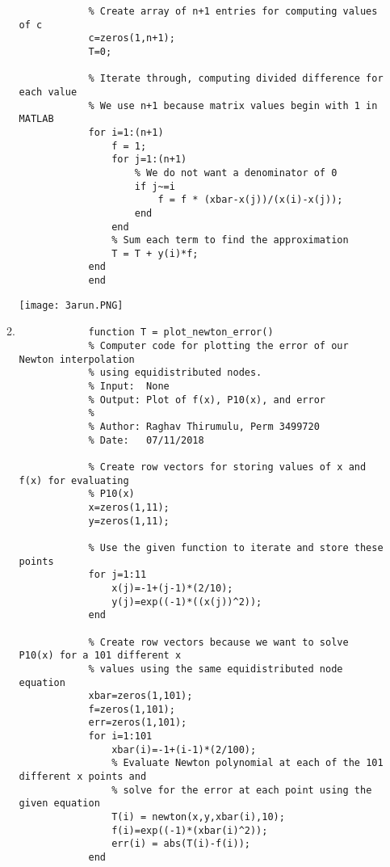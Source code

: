 \documentclass{article}
\begin{document}
\begin{enumerate}
\begin{enumerate}
\begin{lstlisting}
            % Create array of n+1 entries for computing values of c
            c=zeros(1,n+1);
            T=0;

            % Iterate through, computing divided difference for each value
            % We use n+1 because matrix values begin with 1 in MATLAB
            for i=1:(n+1)
                f = 1;
                for j=1:(n+1)
                    % We do not want a denominator of 0
                    if j~=i
                        f = f * (xbar-x(j))/(x(i)-x(j));
                    end
                end
                % Sum each term to find the approximation
                T = T + y(i)*f;
            end
            end
            \end{lstlisting}
            \begin{center}
            \texttt{[image: 3arun.PNG]}
            \end{center}
            
            \item %
            \begin{lstlisting}
            function T = plot_newton_error()
            % Computer code for plotting the error of our Newton interpolation
            % using equidistributed nodes.
            % Input:  None
            % Output: Plot of f(x), P10(x), and error
            %
            % Author: Raghav Thirumulu, Perm 3499720
            % Date:   07/11/2018

            % Create row vectors for storing values of x and f(x) for evaluating
            % P10(x)
            x=zeros(1,11);
            y=zeros(1,11);

            % Use the given function to iterate and store these points
            for j=1:11
                x(j)=-1+(j-1)*(2/10);
                y(j)=exp((-1)*((x(j))^2));
            end

            % Create row vectors because we want to solve P10(x) for a 101 different x
            % values using the same equidistributed node equation
            xbar=zeros(1,101);
            f=zeros(1,101);
            err=zeros(1,101);
            for i=1:101
                xbar(i)=-1+(i-1)*(2/100);
                % Evaluate Newton polynomial at each of the 101 different x points and
                % solve for the error at each point using the given equation
                T(i) = newton(x,y,xbar(i),10);
                f(i)=exp((-1)*(xbar(i)^2));
                err(i) = abs(T(i)-f(i));
            end


\end{lstlisting}
\end{enumerate}
\end{enumerate}
\end{document}
